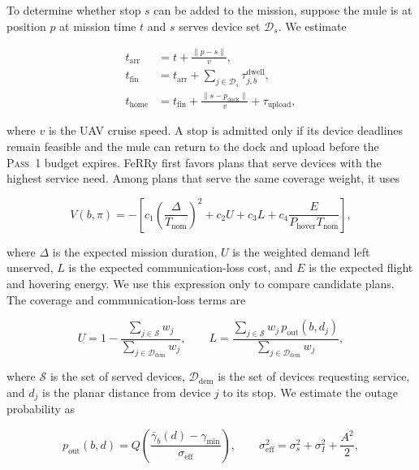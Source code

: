 \documentclass[conference]{IEEEtran}
\newcommand{\sysname}{FeRRy}
\begin{document}
To determine whether stop $s$ can be added to the mission, suppose the mule is at position $p$
at mission time $t$ and $s$ serves device set $\mathcal{D}_s$. We estimate


\begin{align}
t_{\mathrm{arr}}
&=
t+\frac{\|p-s\|}{v},
\\
t_{\mathrm{fin}}
&=
t_{\mathrm{arr}}
+
\sum_{j\in\mathcal{D}_s}
\tau_{j,b}^{\mathrm{dwell}},
\\
t_{\mathrm{home}}
&=
t_{\mathrm{fin}}
+
\frac{\|s-p_{\mathrm{dock}}\|}{v}
+
\tau_{\mathrm{upload}},
\end{align}

where $v$ is the UAV cruise speed. A stop is admitted only if its device
deadlines remain feasible and the mule can return to the dock and upload before the
\textsc{Pass~1} budget expires. \sysname{} first favors plans that serve devices with the highest service need.
Among plans that serve the same coverage weight, it uses

\begin{equation}
V(b,\pi)
=
-
\left[
c_1\left(\frac{\Delta}{T_{\mathrm{nom}}}\right)^2
+
c_2 U
+
c_3 L
+
c_4\frac{E}{P_{\mathrm{hover}}T_{\mathrm{nom}}}
\right],
\label{eq:mission-score}
\end{equation}

where $\Delta$ is the expected mission duration, $U$ is the weighted demand left
unserved, $L$ is the expected communication-loss cost, and $E$ is the expected
flight and hovering energy. We use this expression only to compare candidate
plans. The coverage and communication-loss terms are

\begin{equation}
U=
1-
\frac{\sum_{j\in\mathcal{S}}w_j}
{\sum_{j\in\mathcal{D}_{\mathrm{dem}}}w_j},
\qquad
L=
\frac{\sum_{j\in\mathcal{S}}
w_j\,p_{\mathrm{out}}(b,d_j)}
{\sum_{j\in\mathcal{D}_{\mathrm{dem}}}w_j},
\label{eq:coverage-loss}
\end{equation}

where $\mathcal{S}$ is the set of served devices,
$\mathcal{D}_{\mathrm{dem}}$ is the set of devices requesting service, and
$d_j$ is the planar distance from device $j$ to its stop. We estimate the
outage probability as

\begin{equation}
p_{\mathrm{out}}(b,d)=
Q\!\left(
\frac{\bar{\gamma}_b(d)-\gamma_{\min}}
{\sigma_{\mathrm{eff}}}
\right),
\qquad
\sigma_{\mathrm{eff}}^2
=
\sigma_s^2+\sigma_I^2+\frac{A^2}{2},
\label{eq:outage}
\end{equation}
\end{document}
